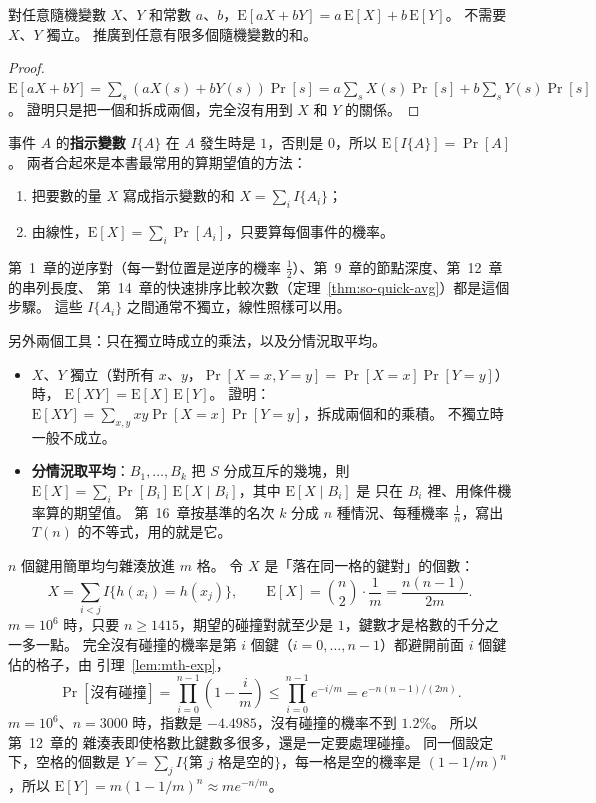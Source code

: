 \begin{theorem}[期望值的線性]
\label{thm:mth-linearity}
對任意隨機變數 $X$、$Y$ 和常數 $a$、$b$，$\mathrm{E}[aX + bY] = a\,\mathrm{E}[X] +
b\,\mathrm{E}[Y]$。 不需要 $X$、$Y$ 獨立。 推廣到任意有限多個隨機變數的和。
\end{theorem}

\begin{proof}
$\mathrm{E}[aX + bY] = \sum_s (aX(s) + bY(s))\Pr[s] = a\sum_s X(s)\Pr[s] + b\sum_s Y(s)\Pr[s]$。
證明只是把一個和拆成兩個，完全沒有用到 $X$ 和 $Y$ 的關係。
\end{proof}

事件 $A$ 的\textbf{指示變數} $I\{A\}$ 在 $A$ 發生時是 $1$，否則是 $0$，所以
$\mathrm{E}[I\{A\}] = \Pr[A]$。 
兩者合起來是本書最常用的算期望值的方法：

\begin{enumerate}
\item 把要數的量 $X$ 寫成指示變數的和 $X = \sum_i I\{A_i\}$；
\item 由線性，$\mathrm{E}[X] = \sum_i \Pr[A_i]$，只要算每個事件的機率。
\end{enumerate}

第~1~章的逆序對（每一對位置是逆序的機率 $\frac12$）、第~9~章的節點深度、第~12~章的串列長度、
第~14~章的快速排序比較次數（定理~\ref{thm:so-quick-avg}）都是這個步驟。 這些 $I\{A_i\}$
之間通常不獨立，線性照樣可以用。

另外兩個工具：只在獨立時成立的乘法，以及分情況取平均。

\begin{itemize}
\item $X$、$Y$ 獨立（對所有 $x$、$y$，$\Pr[X = x, Y = y] = \Pr[X = x]\Pr[Y = y]$）時，
$\mathrm{E}[XY] = \mathrm{E}[X]\,\mathrm{E}[Y]$。 證明：$\mathrm{E}[XY] = \sum_{x,y} xy
\Pr[X = x]\Pr[Y = y]$，拆成兩個和的乘積。 不獨立時一般不成立。
\item \textbf{分情況取平均}：$B_1, \ldots, B_k$ 把 $S$ 分成互斥的幾塊，則
$\mathrm{E}[X] = \sum_i \Pr[B_i]\, \mathrm{E}[X \mid B_i]$，其中 $\mathrm{E}[X \mid B_i]$ 是
只在 $B_i$ 裡、用條件機率算的期望值。 第~16~章按基準的名次 $k$ 分成 $n$ 種情況、每種機率
$\frac1n$，寫出 $T(n)$ 的不等式，用的就是它。
\end{itemize}

$n$ 個鍵用簡單均勻雜湊放進 $m$ 格。 令 $X$ 是「落在同一格的鍵對」的個數：
\[
X = \sum_{i < j} I\{h(x_i) = h(x_j)\}, \qquad
\mathrm{E}[X] = \binom{n}{2} \cdot \frac{1}{m} = \frac{n(n-1)}{2m}.
\]
$m = 10^6$ 時，只要 $n \ge 1415$，期望的碰撞對就至少是 $1$，鍵數才是格數的千分之一多一點。
完全沒有碰撞的機率是第 $i$ 個鍵（$i = 0, \ldots, n - 1$）都避開前面 $i$ 個鍵佔的格子，由
引理~\ref{lem:mth-exp}，
\[
\Pr[\text{沒有碰撞}] = \prod_{i=0}^{n-1}\left(1 - \frac{i}{m}\right)
\le \prod_{i=0}^{n-1} e^{-i/m} = e^{-n(n-1)/(2m)}.
\]
$m = 10^6$、$n = 3000$ 時，指數是 $-4.4985$，沒有碰撞的機率不到 $1.2\%$。 所以第~12~章的
雜湊表即使格數比鍵數多很多，還是一定要處理碰撞。 同一個設定下，空格的個數是
$Y = \sum_{j} I\{\text{第 } j \text{ 格是空的}\}$，每一格是空的機率是 $(1 - 1/m)^n$，所以
$\mathrm{E}[Y] = m(1 - 1/m)^n \approx m e^{-n/m}$。

